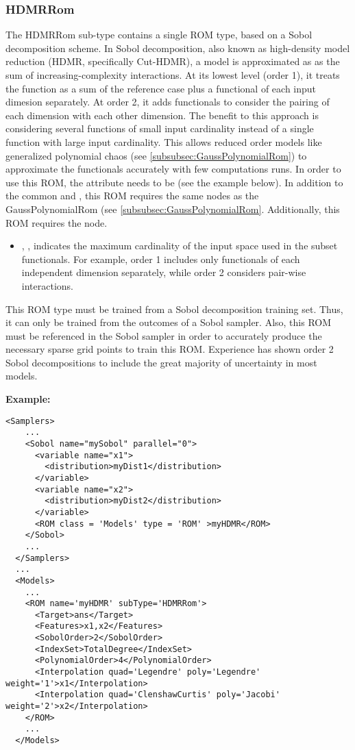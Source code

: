 \subsubsection{HDMRRom}
\label{subsubsec:HDMRRom}
The HDMRRom sub-type contains a single ROM type, based on a Sobol decomposition scheme.
%
In Sobol decomposition, also known as high-density model reduction (HDMR, specifically Cut-HDMR),
a model is approximated as as the sum of increasing-complexity interactions.  At its lowest level (order 1), it treats the function as a sum of the reference case plus a functional of each input dimesion separately.  At order 2, it adds functionals to consider the pairing of each dimension with each other dimension.  The benefit to this approach is considering several functions of small input cardinality instead of a single function with large input cardinality.  This allows reduced order models like generalized polynomial chaos (see \ref{subsubsec:GaussPolynomialRom}) to approximate the functionals accurately with few computations runs.
%
In order to use this ROM, the  attribute  needs to
be  (see the example below).
%
In addition to the common  and , this ROM requires
the same nodes as the GaussPolynomialRom (see \ref{subsubsec:GaussPolynomialRom}.
Additionally, this ROM requires the  node.
\begin{itemize}
  \item {}, ,
  indicates the maximum cardinality of the input space used in the subset functionals.  For example, order 1
  includes only functionals of each independent dimension separately, while order 2 considers pair-wise
  interactions.
\end{itemize}
\nb This ROM type must be trained from a Sobol decomposition training set.
%
Thus, it can only be trained from the outcomes of a Sobol sampler.
Also, this ROM must be referenced in the Sobol sampler in order to
accurately produce the necessary sparse grid points to train this ROM.
Experience has shown order 2 Sobol decompositions to include the great majority of
  uncertainty in most models.

\textbf{Example:}
{\footnotesize
\begin{lstlisting}[style=XML,morekeywords={name,subType}]
  <Samplers>
    ...
    <Sobol name="mySobol" parallel="0">
      <variable name="x1">
        <distribution>myDist1</distribution>
      </variable>
      <variable name="x2">
        <distribution>myDist2</distribution>
      </variable>
      <ROM class = 'Models' type = 'ROM' >myHDMR</ROM>
    </Sobol>
    ...
  </Samplers>
  ...
  <Models>
    ...
    <ROM name='myHDMR' subType='HDMRRom'>
      <Target>ans</Target>
      <Features>x1,x2</Features>
      <SobolOrder>2</SobolOrder>
      <IndexSet>TotalDegree</IndexSet>
      <PolynomialOrder>4</PolynomialOrder>
      <Interpolation quad='Legendre' poly='Legendre' weight='1'>x1</Interpolation>
      <Interpolation quad='ClenshawCurtis' poly='Jacobi' weight='2'>x2</Interpolation>
    </ROM>
    ...
  </Models>
\end{lstlisting}
}

